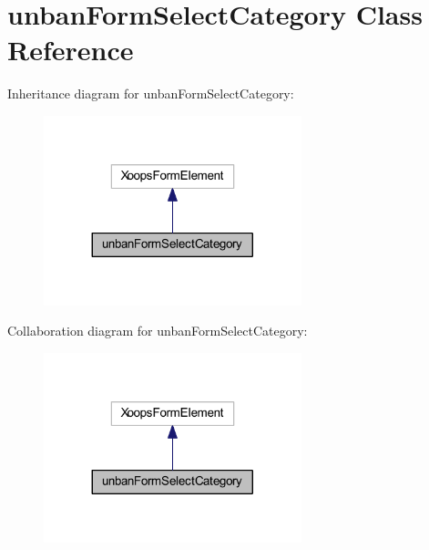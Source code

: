 \hypertarget{classunban_form_select_category}{\section{unban\-Form\-Select\-Category Class Reference}
\label{classunban_form_select_category}
}


Inheritance diagram for unban\-Form\-Select\-Category\-:
\nopagebreak
\begin{figure}[H]
\begin{center}
\leavevmode
\includegraphics[width=212pt]{classunban_form_select_category__inherit__graph}
\end{center}
\end{figure}


Collaboration diagram for unban\-Form\-Select\-Category\-:
\nopagebreak
\begin{figure}[H]
\begin{center}
\leavevmode
\includegraphics[width=212pt]{classunban_form_select_category__coll__graph}
\end{center}
\end{figure}
